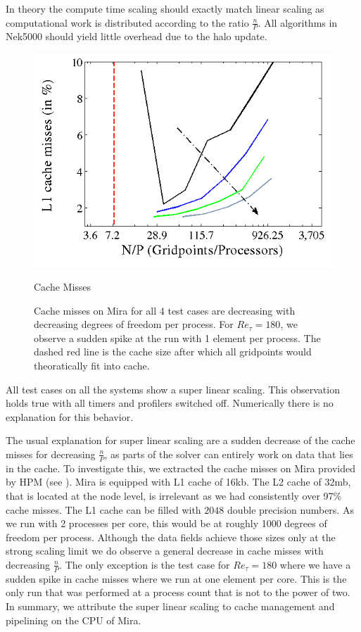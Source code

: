 \documentclass{sig-alternate}
\begin{document}
In theory the compute time scaling should exactly match linear scaling
as computational work is distributed according to the ratio $\frac{n}{P}$. All
algorithms in Nek5000 should yield little overhead due to the halo update. 

\begin{figure}
  \centering
  \includegraphics[width=\linewidth]{./figures/cachelines.png}
  \caption{Cache Misses}
  \label{fig:cachemisses}
  \caption{Cache misses on Mira for all 4 test cases are decreasing with
  decreasing degrees of freedom per process. For $Re_{\tau}=180$, we observe a
  sudden spike at the run with 1 element per process. The dashed red line is the
  cache size after which all gridpoints would theoratically fit into cache.}
\end{figure}

All test cases on all the systems show a super linear scaling. This
observation holds true with all timers and profilers switched off.
Numerically there is no explanation for this behavior. 

The usual explanation for super linear scaling are a sudden decrease of the cache
misses for decreasing $\frac{n}{P}$, as parts of the solver can entirely work on
data that lies in the cache. 
To investigate this, we extracted the cache misses on Mira provided by HPM (see
). Mira is equipped with L1 cache of 16kb. The L2 cache
of 32mb, that is located at the node level, is irrelevant as we had consistently
over 97\% cache misses. The L1 cache can be filled with $2048$ double precision
numbers. As we run with 2 processes per core, this would be at roughly 1000
degrees of freedom per process. Although the data fields achieve those sizes only at the strong scaling
limit we do observe a general decrease in cache misses with decreasing
$\frac{n}{P}$. The only exception is the test case for $Re_{\tau}=180$ where we
have a sudden spike in cache misses where we run at one element per core. This
is the only run that was performed at a process count that is not to the power
of two.
In summary, we attribute the super linear scaling to cache
management and pipelining on the CPU of Mira. 
\end{document}
